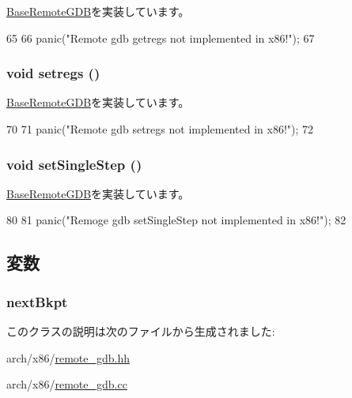 \hyperlink{classBaseRemoteGDB_aca04756a764f2ef2add9ee91be012659}{BaseRemoteGDB}を実装しています。


\begin{DoxyCode}
65 {
66     panic("Remote gdb getregs not implemented in x86!\n");
67 }
\end{DoxyCode}
\hypertarget{classX86ISA_1_1RemoteGDB_a2051121b6bc93c8ca3856bbeeca7bdc1}{
\subsubsection[{setregs}]{\setlength{\rightskip}{0pt plus 5cm}void setregs ()}}
\label{classX86ISA_1_1RemoteGDB_a2051121b6bc93c8ca3856bbeeca7bdc1}


\hyperlink{classBaseRemoteGDB_a6b0b51dc196f12756cc0ec49a3ae6a6a}{BaseRemoteGDB}を実装しています。


\begin{DoxyCode}
70 {
71     panic("Remote gdb setregs not implemented in x86!\n");
72 }
\end{DoxyCode}
\hypertarget{classX86ISA_1_1RemoteGDB_a40d5da340fdb741de8cd3ffbc69708fe}{
\subsubsection[{setSingleStep}]{\setlength{\rightskip}{0pt plus 5cm}void setSingleStep ()}}
\label{classX86ISA_1_1RemoteGDB_a40d5da340fdb741de8cd3ffbc69708fe}


\hyperlink{classBaseRemoteGDB_a253d4b1107e84fe80036d1826067741a}{BaseRemoteGDB}を実装しています。


\begin{DoxyCode}
80 {
81     panic("Remoge gdb setSingleStep not implemented in x86!\n");
82 }
\end{DoxyCode}


\subsection{変数}
\hypertarget{classX86ISA_1_1RemoteGDB_a48116c182f6c43f3f31861355f288231}{
\subsubsection[{nextBkpt}]{ {\bf nextBkpt}}}
\label{classX86ISA_1_1RemoteGDB_a48116c182f6c43f3f31861355f288231}


このクラスの説明は次のファイルから生成されました:\begin{DoxyCompactItemize}
\item 
arch/x86/\hyperlink{arch_2x86_2remote__gdb_8hh}{remote\_\-gdb.hh}\item 
arch/x86/\hyperlink{arch_2x86_2remote__gdb_8cc}{remote\_\-gdb.cc}\end{DoxyCompactItemize}
